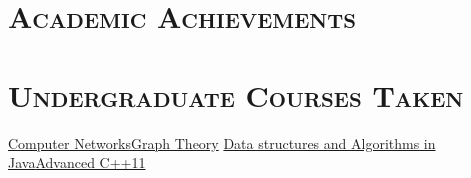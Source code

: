 \documentclass[11pt,a4paper]{moderncv}
\begin{document}
\section{\textsc{Academic Achievements}}


\section{\textsc{Undergraduate Courses Taken}}
		\cvlistdoubleitem
		{\href{http://cs.uwindsor.ca/}{Computer Networks}}{\href{http://cs.uwindsor.ca/}{Graph Theory}}	
		\cvlistdoubleitem
		{\href{http://cs.uwindsor.ca/}{Data structures and Algorithms in Java}}{\href{http://cs.uwindsor.ca/}{Advanced C++11}}	
\end{document}
